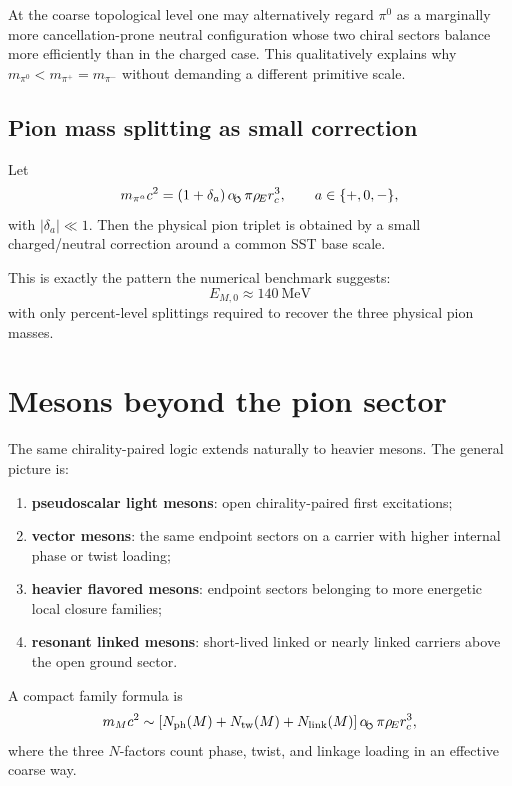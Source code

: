 \documentclass[11pt,a4paper]{article}
\newcommand{\swirlarrow}{\mathchoice{\mkern-2mu\scriptstyle\boldsymbol{\circlearrowleft}}{\mkern-2mu\scriptstyle\boldsymbol{\circlearrowleft}}{\mkern-2mu\scriptscriptstyle\boldsymbol{\circlearrowleft}}{\mkern-2mu\scriptscriptstyle\boldsymbol{\circlearrowleft}}}
\newcommand{\rhoE}{\rho_{\!E}}
\newcommand{\rc}{r_c}
\newcommand{\alphasw}{\alpha_{\!\swirlarrow}}
\newcommand{\piplus}{\pi^{+}}
\newcommand{\piminus}{\pi^{-}}
\newcommand{\pizero}{\pi^{0}}
\begin{document}
At the coarse topological level one may alternatively regard \(\pizero\) as a marginally more cancellation-prone neutral configuration whose two chiral sectors balance more efficiently than in the charged case. This qualitatively explains why \(m_{\pizero}<m_{\piplus}=m_{\piminus}\) without demanding a different primitive scale.

\subsection{Pion mass splitting as small correction}
Let
\begin{equation}
m_{\pi^{a}}c^{2}
=
\left(1+\delta_{a}\right)\alphasw\,\pi\rhoE\rc^{3},
\qquad a\in\{+,0,-\},
\label{eq:pionsplit}
\end{equation}
with \(|\delta_{a}|\ll 1\). Then the physical pion triplet is obtained by a small charged/neutral correction around a common SST base scale.

This is exactly the pattern the numerical benchmark suggests:
\begin{equation}
E_{M,0}\approx 140\ \mathrm{MeV}
\end{equation}
with only percent-level splittings required to recover the three physical pion masses.

\section{Mesons beyond the pion sector}
The same chirality-paired logic extends naturally to heavier mesons. The general picture is:
\begin{enumerate}[label=(\alph*)]
    \item \textbf{pseudoscalar light mesons}: open chirality-paired first excitations;
    \item \textbf{vector mesons}: the same endpoint sectors on a carrier with higher internal phase or twist loading;
    \item \textbf{heavier flavored mesons}: endpoint sectors belonging to more energetic local closure families;
    \item \textbf{resonant linked mesons}: short-lived linked or nearly linked carriers above the open ground sector.
\end{enumerate}

A compact family formula is
\begin{equation}
m_{M}c^{2}
\sim
\left[N_{\text{ph}}(M)+N_{\text{tw}}(M)+N_{\text{link}}(M)\right]
\alphasw\,\pi\rhoE\rc^{3},
\label{eq:familyformula}
\end{equation}
where the three \(N\)-factors count phase, twist, and linkage loading in an effective coarse way.
\end{document}
